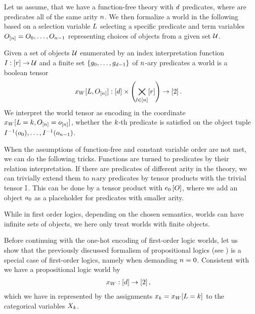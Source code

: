 Let us assume, that we have a function-free theory with $d$ predicates, where are predicates all of the same arity $n$.
We then formalize a world in the following based on a selection variable $L$ selecting a specific predicate and term variables $O_{[n]}=O_{0},\ldots,O_{n-1}$ representing choices of objects from a given set $\mathcal{U}$.

\begin{definition}
    \label{def:folWorld}
    Given a set of objects $\mathcal{U}$ enumerated by an index interpretation function $I:[r]\rightarrow \mathcal{U}$ and a finite set $\{g_{0},\ldots,g_{d-1}\}$ of $n$-ary predicates a world is a boolean tensor
    \begin{align}
        \dataworldwith : [\catorder] \times \left( \symindstates\right) \rightarrow [2] \, . %
    \end{align}
    We interpret the world tensor as encoding in the coordinate $x_{W}[L=k,O_{[n]}=o_{[n]}]$, whether the $k$-th predicate is satisfied on the object tuple $I^{-1}(o_{0}),\ldots,I^{-1}(o_{n-1})$.
\end{definition}


When the assumptions of function-free and constant variable order are not met, we can do the following tricks.
Functions are turned to predicates by their relation interpretation.
If there are predicates of different arity in the theory, we can trivially extend them to $n$ary predicates by tensor products with the trivial tensor $\mathbb{I}$.
This can be done by a tensor product with $e_{0}\left[O\right]$, where we add an object $a_{0}$ as a placeholder for predicates with smaller arity.

While in first order logics, depending on the chosen semantics, worlds can have infinite sets of objects, we here only treat worlds with finite objects.


%
Before continuing with the one-hot encoding of first-order logic worlds, let us show that the previously discussed formalism of propositional logics (see ) is a special case of first-order logics, namely when demanding $n=0$.
Consistent with  we have a propositional logic world by
\begin{align*}
    x_{W}: [d] \rightarrow [2] \, ,
\end{align*}
which we have in  represented by the assignments $x_{k} = x_{W}[L=k]$ to the categorical variables $X_{k}$.


